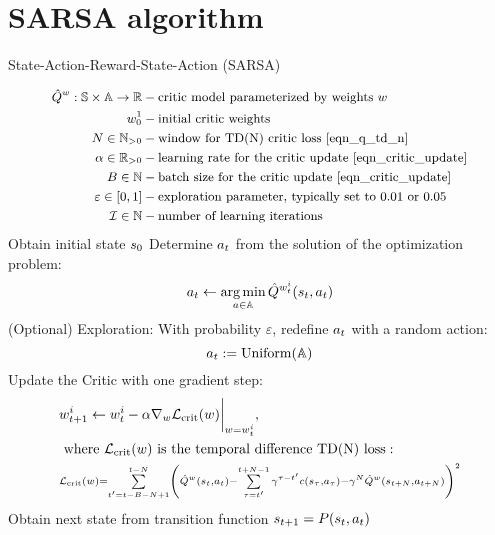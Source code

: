 \documentclass[12pt,twoside]{../../mitthesis}
\begin{document}
\section*{SARSA algorithm}
\begin{algorithm}
    \caption{State-Action-Reward-State-Action (SARSA)}
    \label{alg:my-alg}
    \begin{algorithmic}[1]
    \begin{equation*}
        \small
        \begin{aligned}
            \hat{Q}^w : \mathbb S \times \mathbb A \to {\mathbb{R}} &- \text{critic model parameterized by weights $w$} \\
            w_0^1 & - \text{initial critic weights} \\
            N \in {\mathbb{N}}_{>0} & - \text{window for TD(N) critic loss \eqref{eqn_q_td_n}} \\
            \alpha \in {\mathbb{R}}_{>0}& - \text{learning rate for the critic update \eqref{eqn_critic_update}} \\
            B \in {\mathbb{N}} & - \text{batch size for the critic update \eqref{eqn_critic_update}} \\
            \varepsilon \in [0, 1] & - \text{exploration parameter, typically set to 0.01 or 0.05} \\
            \mathcal I \in {\mathbb{N}} & - \text{number of learning iterations}
        \end{aligned}
    \end{equation*}
        \STATE Obtain initial state $s_0$
            \STATE Determine $a_t$ from the solution of the optimization problem:
            $$
                a_t \gets \operatorname*{\text{arg\,min}}_{a \in \mathbb A} \hat Q^{w_t^i}(s_{t}, a_{t})
            $$
            \STATE (Optional) Exploration: With probability $\varepsilon$, redefine $a_t$ with a random action:
            $$
                a_t := \operatorname{Uniform}(\mathbb A) 
            $$
            \STATE Update the Critic with one gradient step:
            \begin{equation}
                \label{eqn_critic_update}
                \begin{aligned}
                &w_{t+1}^i \gets w^i_{t} - \alpha \nabla_w\mathcal L_{{\text{crit}}}(w)\bigg\rvert_{w = w^i_{t}}, \\
                &\text{ where } \mathcal L_{{\text{crit}}}(w) \text{ is the temporal difference TD(N) loss}: \\
                &\scriptstyle {\mathcal L_{{\text{crit}}}(w) = \sum\limits_{t'=t-B-N+1}^{t - N}\left(\hat Q^w(s_t, a_t) - \sum\limits_{\tau=t'}^{t + N - 1} \gamma^{\tau-t'}c(s_{\tau}, a_{\tau}) - \gamma^{N}\hat Q^w(s_{t + N}, a_{t + N})\right)^2}
                \end{aligned}
            \end{equation}
            \STATE Obtain next state from transition function $s_{t+1} = P(s_t, a_t)$
        \ENDFOR
    \ENDFOR
    \end{algorithmic}
\end{algorithm}
\end{document}
